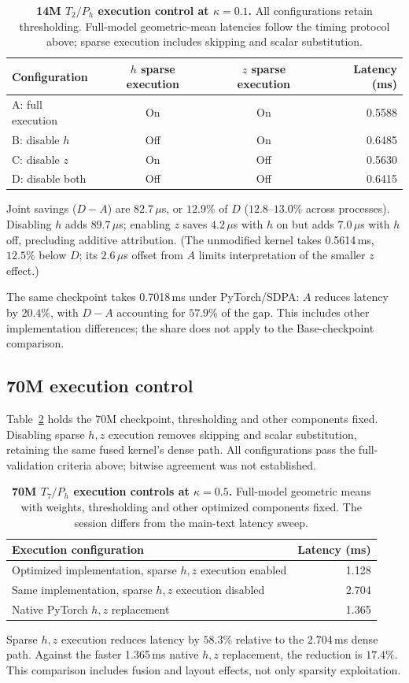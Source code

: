 \begin{table}[!htbp]
\centering\small
\caption{\textbf{14M $T_2/P_h$ execution control at $\kappa=0.1$.}
All configurations retain thresholding. Full-model geometric-mean latencies
follow the timing protocol above; sparse execution includes skipping and
scalar substitution.}
\label{tab:t2-hz-control}
\begin{tabular}{@{}lccr@{}}
\toprule
Configuration & $h$ sparse execution & $z$ sparse execution & Latency (ms) \\
\midrule
A: full execution & On & On & 0.5588 \\
B: disable $h$ & Off & On & 0.6485 \\
C: disable $z$ & On & Off & 0.5630 \\
D: disable both & Off & Off & 0.6415 \\
\bottomrule
\end{tabular}
\end{table}

Joint savings ($D-A$) are $82.7\,\mu$s, or $12.9\%$ of $D$ ($12.8$--$13.0\%$ across processes). Disabling $h$ adds $89.7\,\mu$s; enabling $z$ saves $4.2\,\mu$s with $h$ on but adds $7.0\,\mu$s with $h$ off, precluding additive attribution. (The unmodified kernel takes 0.5614\,ms, $12.5\%$ below $D$; its $2.6\,\mu$s offset from $A$ limits interpretation of the smaller $z$ effect.)

The same checkpoint takes 0.7018\,ms under PyTorch/SDPA: $A$ reduces latency by $20.4\%$, with $D-A$ accounting for $57.9\%$ of the gap. This includes other implementation differences; the share does not apply to the Base-checkpoint comparison.

\subsection{70M execution control}
\label{app:kernel-transfer}
Table~\ref{tab:70m-hz-control} holds the 70M checkpoint, thresholding and other components fixed. Disabling sparse $h,z$ execution removes skipping and scalar substitution, retaining the same fused kernel's dense path. All configurations pass the full-validation criteria above; bitwise agreement was not established.

\begin{table}[!htbp]
\centering\small
\caption{\textbf{70M $T_7/P_h$ execution controls at $\kappa=0.5$.}
Full-model geometric means with weights, thresholding and other optimized
components fixed. The session differs from the main-text latency sweep.}
\label{tab:70m-hz-control}
\begin{tabularx}{\linewidth}{@{}>{\raggedright\arraybackslash}Xr@{}}
\toprule
Execution configuration & Latency (ms) \\
\midrule
Optimized implementation, sparse $h,z$ execution enabled & 1.128 \\
Same implementation, sparse $h,z$ execution disabled & 2.704 \\
Native PyTorch $h,z$ replacement & 1.365 \\
\bottomrule
\end{tabularx}
\end{table}

Sparse $h,z$ execution reduces latency by $58.3\%$ relative to the 2.704\,ms dense path. Against the faster 1.365\,ms native $h,z$ replacement, the reduction is $17.4\%$. This comparison includes fusion and layout effects, not only sparsity exploitation.
